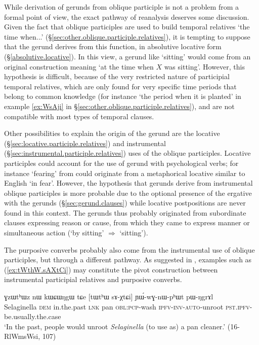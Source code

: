 While derivation of gerunds from oblique participle is not a problem from a formal point of view, the exact pathway of reanalysis deserves some discussion. Given the fact that oblique participles are used to build temporal relatives `the time when...' (§\ref{sec:other.oblique.participle.relatives}), it is tempting to suppose that the gerund derives from this function, in absolutive locative form (§\ref{absolutive.locative}). In this view, a gerund like  `sitting' would come from an original construction meaning `at the time when $X$ was sitting'. However, this hypothesis is difficult, because of the very restricted nature of participial temporal relatives, which are only found for very specific time periods that belong to common knowledge (for instance  `the period when it is planted' in example \ref{ex:WsAji} in §\ref{sec:other.oblique.participle.relatives}), and are not compatible with most types of temporal clauses.

Other possibilities to explain the origin of the gerund are the locative (§\ref{sec:locative.participle.relatives}) and instrumental (§\ref{sec:instrumental.participle.relatives}) uses of the oblique participles. Locative participles could account for the use of gerund with psychological verbs; for instance  `fearing' from  could originate from a metaphorical locative similar to English `in fear'. However, the hypothesis that gerunds derive from instrumental oblique participles is more probable due to the optional presence of the ergative  with the gerunds (§\ref{sec:gerund.clauses}) while locative postpositions are never found in this context. The gerunds thus probably originated from subordinate clauses expressing reason or cause, from which they came to express manner or simultaneous action (`by sitting' $\Rightarrow$ `sitting').

The purposive converbs probably also come from the instrumental use of oblique participles, but through a different pathway. As suggested in \citet[272]{jacques14linking}, examples such as (\ref{ex:tWthW.sAXtCi}) may constitute the pivot construction between instrumental participial relatives and purposive converbs.


\begin{exe}
\ex \label{ex:tWthW.sAXtCi}
\gll ɣzɯtʰɯz nɯ kɯɕɯŋgɯ tɕe [tɯtʰɯ sɤ-χtɕi] ɲɯ́-wɣ-nɯ-pʰɯt pɯ-ŋgrɤl \\
Selaginella \textsc{dem} in.the.past \textsc{lnk} pan \textsc{obl}:\textsc{pcp}-wash \textsc{ipfv}-\textsc{inv}-\textsc{auto}-unroot \textsc{pst}.\textsc{ipfv}-be.usually.the.case \\
\glt `In the past, people would unroot \textit{Selaginella} (to use as) a pan cleaner.' (16-RlWmsWsi, 107)
\end{exe}

